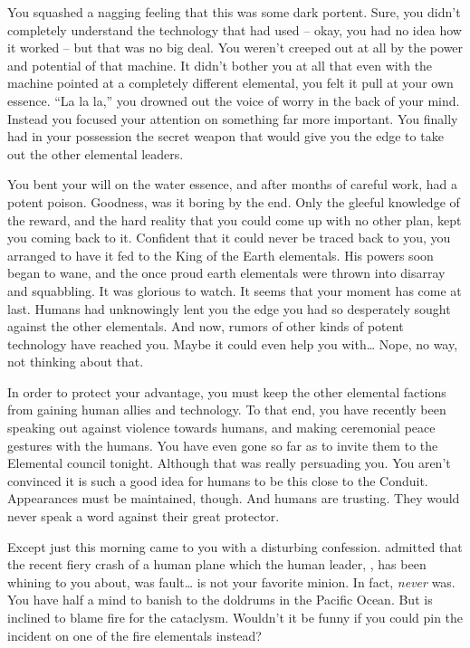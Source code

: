 \documentclass[char]{elementals}
\begin{document}
You squashed a nagging feeling that this was some dark portent. Sure, you didn't completely understand the technology that \cGD{} had used -- okay, you had no idea how it worked -- but that was no big deal. You weren't creeped out at all by the power and potential of that machine. It didn't bother you at all that even with the machine pointed at a completely different elemental, you felt it pull at your own essence. ``La la la,'' you drowned out the voice of worry in the back of your mind. Instead you focused your attention on something far more important. You finally had in your possession the secret weapon that would give you the edge to take out the other elemental leaders.

You bent your will on the water essence, and after months of careful work, had a potent poison. Goodness, was it boring by the end. Only the gleeful knowledge of the reward, and the hard reality that you could come up with no other plan, kept you coming back to it. Confident that it could never be traced back to you, you arranged to have it fed to the King of the Earth elementals. His powers soon began to wane, and the once proud earth elementals were thrown into disarray and squabbling. It was glorious to watch. It seems that your moment has come at last. Humans had unknowingly lent you the edge you had so desperately sought against the other elementals. And now, rumors of other kinds of potent technology have reached you. Maybe it could even help you with{\ldots} Nope, no way, not thinking about that.

In order to protect your advantage, you must keep the other elemental factions from gaining human allies and technology. To that end, you have recently been speaking out against violence towards humans, and making ceremonial peace gestures with the humans. You have even gone so far as to invite them to the Elemental council tonight. Although that was really \cNaturalist{} persuading you. You aren't convinced it is such a good idea for humans to be this close to the Conduit. Appearances must be maintained, though. And humans are trusting. They would never speak a word against their great protector.

Except just this morning \cNaturalist{} came to you with a disturbing confession. \cNaturalist{\They} admitted that the recent fiery crash of a human plane which the human leader, \cLeader{\full}, has been whining to you about, was \cNaturalist{\their} fault{\ldots} \cNaturalist{} is not your favorite minion. In fact, \cNaturalist{\they} \emph{never} was. You have half a mind to banish \cNaturalist{\their} to the doldrums in the Pacific Ocean. But \cLeader{} is inclined to blame fire for the cataclysm. Wouldn't it be funny if you could pin the incident on one of the fire elementals instead?
\end{document}
